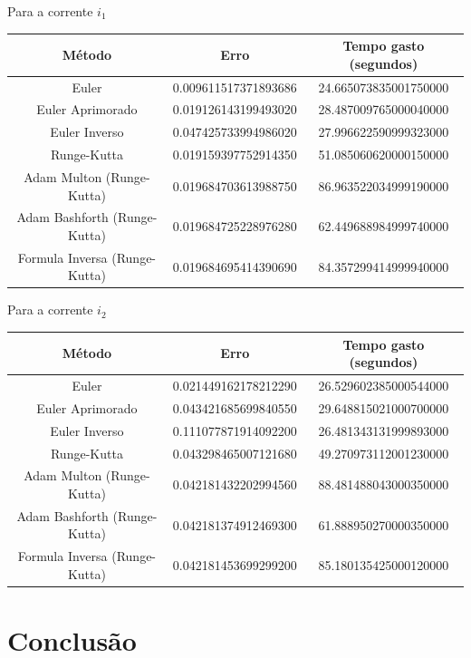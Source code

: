 \documentclass[12pt]{article}%
\newcommand{\newpara}
    {
    \vskip 0.5cm
    }
\begin{document}
    Para a corrente \(i_{1}\)
    \begin{center}
    \begin{tabular}{ |c| |c| |c| }
    \hline
    \textbf{Método}               & \textbf{Erro}        & \textbf{Tempo gasto (segundos)} \\ \hline
    Euler                         & 0.009611517371893686 & 24.665073835001750000           \\ \hline
    Euler Aprimorado              & 0.019126143199493020 & 28.487009765000040000           \\ \hline
    Euler Inverso                 & 0.047425733994986020 & 27.996622590999323000           \\ \hline
    Runge-Kutta                   & 0.019159397752914350 & 51.085060620000150000           \\ \hline
    Adam Multon     (Runge-Kutta) & 0.019684703613988750 & 86.963522034999190000           \\ \hline
    Adam Bashforth (Runge-Kutta)  & 0.019684725228976280 & 62.449688984999740000           \\ \hline
    Formula Inversa (Runge-Kutta) & 0.019684695414390690 & 84.357299414999940000           \\ \hline
    \end{tabular}
    \end{center}
    
    \newpara
    Para a corrente \(i_{2}\)
    \begin{center}
    \begin{tabular}{ |c| |c| |c| }
    \hline
    \textbf{Método}               & \textbf{Erro}        & \textbf{Tempo gasto (segundos)} \\ \hline
    Euler                         & 0.021449162178212290 & 26.529602385000544000           \\ \hline
    Euler Aprimorado              & 0.043421685699840550 & 29.648815021000700000           \\ \hline
    Euler Inverso                 & 0.111077871914092200 & 26.481343131999893000           \\ \hline
    Runge-Kutta                   & 0.043298465007121680 & 49.270973112001230000           \\ \hline
    Adam Multon     (Runge-Kutta) & 0.042181432202994560 & 88.481488043000350000           \\ \hline
    Adam Bashforth (Runge-Kutta)  & 0.042181374912469300 & 61.888950270000350000           \\ \hline
    Formula Inversa (Runge-Kutta) & 0.042181453699299200 & 85.180135425000120000           \\ \hline
    \end{tabular}
    \end{center}
    
\newpage
\section{Conclusão}
\end{document}
